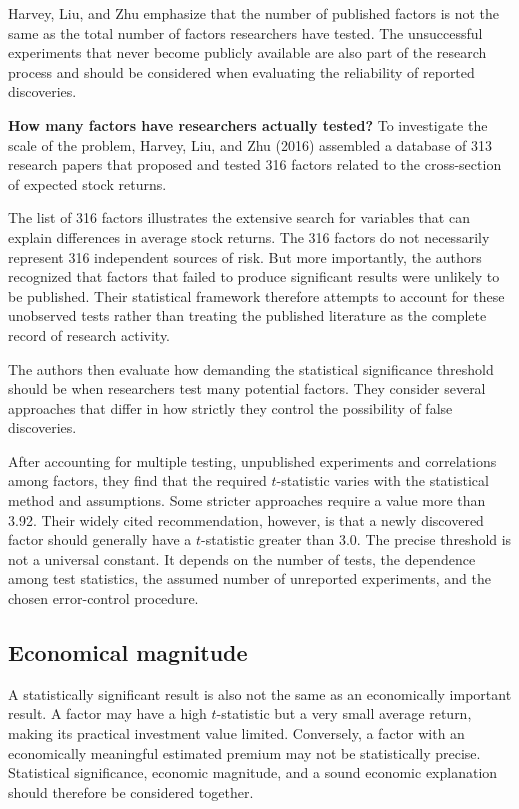 Harvey, Liu, and Zhu emphasize that the number of published
factors is not the same as the total number of factors researchers
have tested. The unsuccessful experiments that never become
publicly available are also part of the research process and
should be considered when evaluating the reliability of reported
discoveries.

\textbf{How many factors have researchers actually tested?}
To investigate the scale of the problem, Harvey, Liu, and Zhu
(2016) assembled a database of 313 research papers that proposed
and tested 316 factors related to the cross-section of expected
stock returns. 

The list of 316 factors illustrates the extensive search for
variables that can explain differences in average stock returns.
The 316 factors do
not necessarily represent 316 independent sources of risk.
But more importantly, the authors recognized that factors that failed to
produce significant results were unlikely to be published.
Their statistical framework therefore attempts to account for
these unobserved tests rather than treating the published
literature as the complete record of research activity.

The authors then evaluate how demanding the statistical
significance threshold should be when researchers test many
potential factors. They consider several approaches that
differ in how strictly they control the possibility of false
discoveries. 


After accounting for multiple testing, unpublished
experiments and correlations among factors, they find
that the required $t$-statistic varies with the statistical
method and assumptions. Some stricter approaches require
a value more than 3.92. Their widely cited recommendation,
however, is that a newly discovered factor should generally
have a $t$-statistic greater than 3.0.
The precise threshold is not a universal constant. It depends
on the number of tests, the dependence among test statistics,
the assumed number of unreported experiments, and the chosen
error-control procedure. 

\subsection{Economical magnitude}
A statistically significant result is also not the same
as an economically important result. A factor may have a
high $t$-statistic but a very small average return, making
its practical investment value limited. Conversely, a
factor with an economically meaningful estimated premium
may not be statistically precise. Statistical significance,
economic magnitude, and a sound economic explanation
should therefore be considered together.

